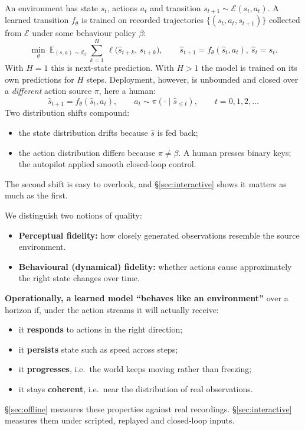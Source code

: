 \documentclass[11pt]{article}
\begin{document}
An environment has state $s_t$, actions $a_t$ and transition $s_{t+1}\sim\mathcal{E}(s_t,a_t)$. A learned transition $f_\theta$ is trained on recorded trajectories $\{(s_t,a_t,s_{t+1})\}$ collected from $\mathcal{E}$ under some behaviour policy $\beta$:
\begin{equation}
\min_\theta\ \mathbb{E}_{(s,a)\sim d_\beta}\ \sum_{k=1}^{H}\ \ell\big(\hat s_{t+k},\,s_{t+k}\big),\qquad \hat s_{t+1}=f_\theta(\hat s_t,a_t),\ \hat s_t=s_t .
\label{eq:train}
\end{equation}
With $H=1$ this is next-state prediction. With $H>1$ the model is trained on its own predictions for $H$ steps. Deployment, however, is unbounded and closed over a \emph{different} action source $\pi$, here a human:
\begin{equation}
\hat s_{t+1}=f_\theta(\hat s_t,a_t),\qquad a_t\sim\pi(\cdot\mid\hat s_{\le t}),\qquad t=0,1,2,\dots
\label{eq:deploy}
\end{equation}
Two distribution shifts compound:
\begin{itemize}
  \item the state distribution drifts because $\hat s$ is fed back;
  \item the action distribution differs because $\pi\neq\beta$. A human presses binary keys; the autopilot applied smooth closed-loop control.
\end{itemize}
The second shift is easy to overlook, and \S\ref{sec:interactive} shows it matters as much as the first.

We distinguish two notions of quality:
\begin{itemize}
  \item \textbf{Perceptual fidelity:} how closely generated observations resemble the source environment.
  \item \textbf{Behavioural (dynamical) fidelity:} whether actions cause approximately the right state changes over time.
\end{itemize}

\textbf{Operationally, a learned model ``behaves like an environment''} over a horizon if, under the action streams it will actually receive:
\begin{itemize}
  \item[(i)] it \textbf{responds} to actions in the right direction;
  \item[(ii)] it \textbf{persists} state such as speed across steps;
  \item[(iii)] it \textbf{progresses}, i.e.\ the world keeps moving rather than freezing;
  \item[(iv)] it stays \textbf{coherent}, i.e.\ near the distribution of real observations.
\end{itemize}
\S\ref{sec:offline} measures these properties against real recordings. \S\ref{sec:interactive} measures them under scripted, replayed and closed-loop inputs.
\end{document}

